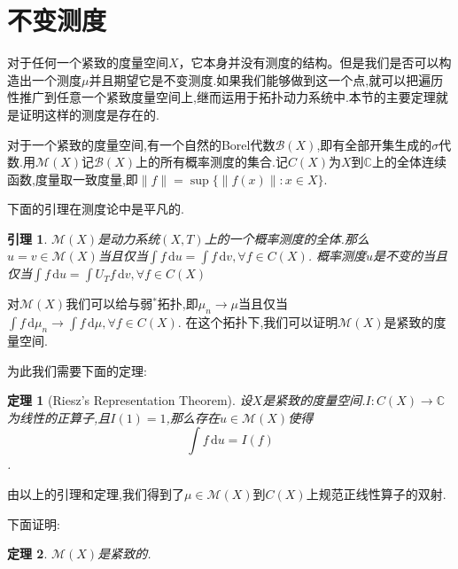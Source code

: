 \documentclass[a4paper,11pt,oneside]{book}
\newtheorem{theorem}{\textbf{\hspace{0.7cm}定理}}[section]
\newtheorem{lemma}{\textbf{\hspace{0.7cm}引理}}[section]
\newcommand{\B}{\mathcal{B}}
\begin{document}
\section{不变测度}
对于任何一个紧致的度量空间$X$，它本身并没有测度的结构。但是我们是否可以构造出一个测度$\mu$并且期望它是不变测度.如果我们能够做到这一个点,就可以把遍历性推广到任意一个紧致度量空间上,继而运用于拓扑动力系统中.本节的主要定理就是证明这样的测度是存在的.

对于一个紧致的度量空间,有一个自然的Borel代数$\B (X)$,即有全部开集生成的$\sigma$代数.用$\mathcal{M}(X)$记$\mathcal{B}(X)$上的所有概率测度的集合.记$C(X)$为$X$到$\mathbb{C}$上的全体连续函数,度量取一致度量,即$\|f\|=\sup\{\|f(x)\|:x\in X\}$.

下面的引理在测度论中是平凡的.
\begin{lemma}
\label{l}
$\mathcal{M}(X)$是动力系统$(X,T)$上的一个概率测度的全体.那么$u=v\in \mathcal{M}(X)$当且仅当$\int\!f \, \mathrm{d}u=\int f\, \mathrm{d}v,\forall f\in C(X)$.
概率测度$u$是不变的当且仅当$\int\!f \, \mathrm{d}u=\int\! U_Tf\, \mathrm{d}v,\forall f\in C(X)$
\end{lemma}

对$\mathcal{M}(X)$我们可以给与弱$^*$拓扑,即$\mu_n\rightarrow \mu$当且仅当$\int\!f \, \mathrm{d}\mu_n\rightarrow \int\!f \, \mathrm{d}\mu,\forall f \in C(X)$.
在这个拓扑下,我们可以证明$\mathcal{M}(X)$是紧致的度量空间.

为此我们需要下面的定理:
\begin{theorem}[Riesz's Representation Theorem]

设$X$是紧致的度量空间.$I:C(X)\rightarrow \mathbb{C}$为线性的正算子,且$I(1)=1$,那么存在$u\in \mathcal{M}(X)$使得$$\int \!f\,\mathrm{d}u=I(f)$$.

\end{theorem}

由以上的引理和定理,我们得到了$\mu\in \mathcal{M}(X)$到$C(X)$上规范正线性算子的双射.

下面证明:
\begin{theorem}
$\mathcal{M}(X)$是紧致的.
\end{theorem}
\end{document}
